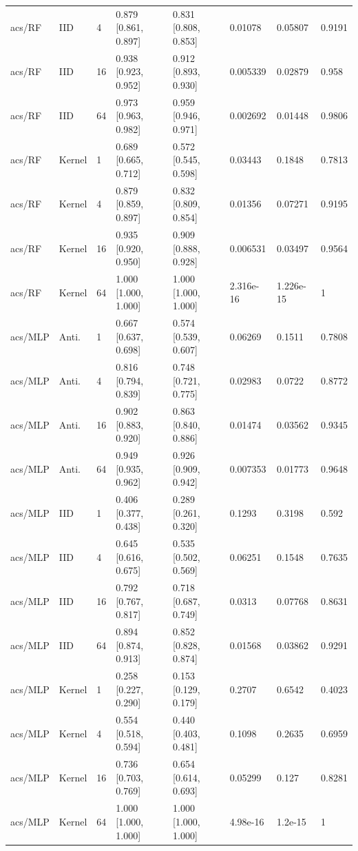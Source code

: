\begin{tabular}{llllllll}
acs/RF & IID & 4 & 0.879 [0.861, 0.897] & 0.831 [0.808, 0.853] & 0.01078 & 0.05807 & 0.9191 \\
acs/RF & IID & 16 & 0.938 [0.923, 0.952] & 0.912 [0.893, 0.930] & 0.005339 & 0.02879 & 0.958 \\
acs/RF & IID & 64 & 0.973 [0.963, 0.982] & 0.959 [0.946, 0.971] & 0.002692 & 0.01448 & 0.9806 \\
acs/RF & Kernel & 1 & 0.689 [0.665, 0.712] & 0.572 [0.545, 0.598] & 0.03443 & 0.1848 & 0.7813 \\
acs/RF & Kernel & 4 & 0.879 [0.859, 0.897] & 0.832 [0.809, 0.854] & 0.01356 & 0.07271 & 0.9195 \\
acs/RF & Kernel & 16 & 0.935 [0.920, 0.950] & 0.909 [0.888, 0.928] & 0.006531 & 0.03497 & 0.9564 \\
acs/RF & Kernel & 64 & 1.000 [1.000, 1.000] & 1.000 [1.000, 1.000] & 2.316e-16 & 1.226e-15 & 1 \\
acs/MLP & Anti. & 1 & 0.667 [0.637, 0.698] & 0.574 [0.539, 0.607] & 0.06269 & 0.1511 & 0.7808 \\
acs/MLP & Anti. & 4 & 0.816 [0.794, 0.839] & 0.748 [0.721, 0.775] & 0.02983 & 0.0722 & 0.8772 \\
acs/MLP & Anti. & 16 & 0.902 [0.883, 0.920] & 0.863 [0.840, 0.886] & 0.01474 & 0.03562 & 0.9345 \\
acs/MLP & Anti. & 64 & 0.949 [0.935, 0.962] & 0.926 [0.909, 0.942] & 0.007353 & 0.01773 & 0.9648 \\
acs/MLP & IID & 1 & 0.406 [0.377, 0.438] & 0.289 [0.261, 0.320] & 0.1293 & 0.3198 & 0.592 \\
acs/MLP & IID & 4 & 0.645 [0.616, 0.675] & 0.535 [0.502, 0.569] & 0.06251 & 0.1548 & 0.7635 \\
acs/MLP & IID & 16 & 0.792 [0.767, 0.817] & 0.718 [0.687, 0.749] & 0.0313 & 0.07768 & 0.8631 \\
acs/MLP & IID & 64 & 0.894 [0.874, 0.913] & 0.852 [0.828, 0.874] & 0.01568 & 0.03862 & 0.9291 \\
acs/MLP & Kernel & 1 & 0.258 [0.227, 0.290] & 0.153 [0.129, 0.179] & 0.2707 & 0.6542 & 0.4023 \\
acs/MLP & Kernel & 4 & 0.554 [0.518, 0.594] & 0.440 [0.403, 0.481] & 0.1098 & 0.2635 & 0.6959 \\
acs/MLP & Kernel & 16 & 0.736 [0.703, 0.769] & 0.654 [0.614, 0.693] & 0.05299 & 0.127 & 0.8281 \\
acs/MLP & Kernel & 64 & 1.000 [1.000, 1.000] & 1.000 [1.000, 1.000] & 4.98e-16 & 1.2e-15 & 1 \\
\bottomrule
\end{tabular}

\endgroup
